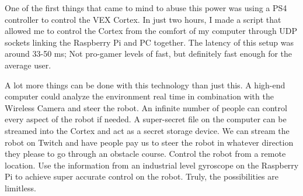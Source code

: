 One of the first things that came to mind to abuse this power was using a PS4 controller to control the VEX Cortex. In just two hours, I made a script that allowed me to control the Cortex from the comfort of my computer through UDP sockets linking the Raspberry Pi and PC together. The latency of this setup was around 33-50 ms; Not pro-gamer levels of fast, but definitely fast enough for the average user.

A lot more things can be done with this technology than just this. A high-end computer could analyze the environment real time in combination with the Wireless Camera and steer the robot. An infinite number of people can control every aspect of the robot if needed. A super-secret file on the computer can be streamed into the Cortex and act as a secret storage device. We can stream the robot on Twitch and have people pay us to steer the robot in whatever direction they please to go through an obstacle course. Control the robot from a remote location. Use the information from an industrial level gyroscope on the Raspberry Pi to achieve super accurate control on the robot. Truly, the possibilities are limitless. 


